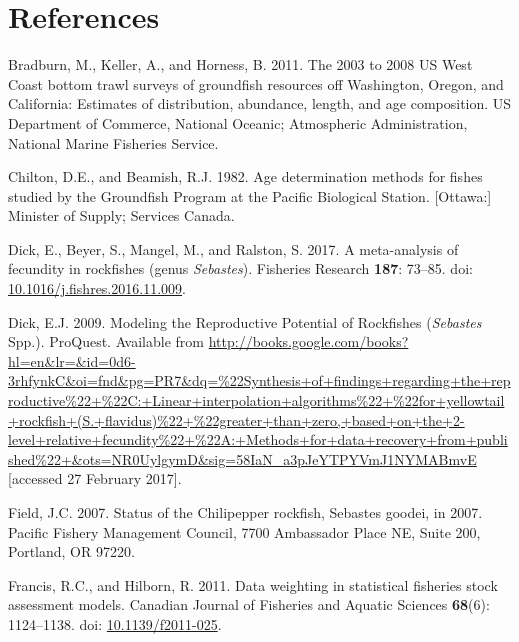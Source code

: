 \documentclass[12pt,]{article}
\begin{document}
\FloatBarrier

\newpage

\color{black}

\section{References}\label{references}

\renewcommand{\thepage}{}

\hypertarget{refs}{}
\hypertarget{ref-bradburn_2003_2011}{}
Bradburn, M., Keller, A., and Horness, B. 2011. The 2003 to 2008 US West
Coast bottom trawl surveys of groundfish resources off Washington,
Oregon, and California: Estimates of distribution, abundance, length,
and age composition. US Department of Commerce, National Oceanic;
Atmospheric Administration, National Marine Fisheries Service.

\hypertarget{ref-chilton_age_1982}{}
Chilton, D.E., and Beamish, R.J. 1982. Age determination methods for
fishes studied by the Groundfish Program at the Pacific Biological
Station. {[}Ottawa:{]} Minister of Supply; Services Canada.

\hypertarget{ref-dick_meta-analysis_2017}{}
Dick, E., Beyer, S., Mangel, M., and Ralston, S. 2017. A meta-analysis
of fecundity in rockfishes (genus \emph{Sebastes}). Fisheries Research
\textbf{187}: 73--85. doi:
\href{https://doi.org/10.1016/j.fishres.2016.11.009}{10.1016/j.fishres.2016.11.009}.

\hypertarget{ref-dick_modeling_2009}{}
Dick, E.J. 2009. Modeling the Reproductive Potential of Rockfishes
(\emph{Sebastes} Spp.). ProQuest. Available from
\url{http://books.google.com/books?hl=en\&lr=\&id=0d6-3rhfynkC\&oi=fnd\&pg=PR7\&dq=\%22Synthesis+of+findings+regarding+the+reproductive\%22+\%22C:+Linear+interpolation+algorithms\%22+\%22for+yellowtail+rockfish+(S.+flavidus)\%22+\%22greater+than+zero,+based+on+the+2-level+relative+fecundity\%22+\%22A:+Methods+for+data+recovery+from+published\%22+\&ots=NR0UylgymD\&sig=58IaN_a3pJeYTPYVmJ1NYMABmvE}
{[}accessed 27 February 2017{]}.

\hypertarget{ref-field_status_2007}{}
Field, J.C. 2007. Status of the Chilipepper rockfish, Sebastes goodei,
in 2007. Pacific Fishery Management Council, 7700 Ambassador Place NE,
Suite 200, Portland, OR 97220.

\hypertarget{ref-francis_data_2011}{}
Francis, R.C., and Hilborn, R. 2011. Data weighting in statistical
fisheries stock assessment models. Canadian Journal of Fisheries and
Aquatic Sciences \textbf{68}(6): 1124--1138. doi:
\href{https://doi.org/10.1139/f2011-025}{10.1139/f2011-025}.
\end{document}

